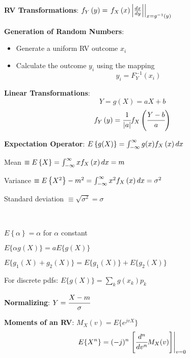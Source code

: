 \documentclass{article}
\newcommand{\sect}[1]{\noindent\textbf{#1}}
\begin{document}
\begin{small}
\begin{multicols*}{2}
	\sect{RV Transformations}: $\pdf[Y][y] = \left.\pdf[X][x] \left|\frac{dx}{dy}\right|\right|_{x=g^{-1}(y)}$
	
	\sect{Generation of Random Numbers}:
	
	\begin{itemize}
		\item Generate a uniform RV outcome $x_i$
		\item Calculate the outcome $y_i$ using the mapping
		\[y_i = F_Y^{-1}(x_i)\]
	\end{itemize}

	\sect{Linear Transformations}:
	\[Y = g(X) = aX+b\]
	\[\pdf[Y][y] = \cfrac{1}{|a|}\pdf[X][\cfrac{Y-b}{a}] \]
	
	\sect{Expectation Operator}: $E\left\{ g(X) \right\} = \int^\infty_{-\infty} g(x)\pdf dx$
	
	Mean $\equiv E\left\{ X \right\} = \int_{-\infty}^{\infty} x\pdf dx = m$
	
	Variance $\equiv E\left\{ X^2 \right\} - m^2 = \int_{-\infty}^{\infty} x^2 \pdf dx = \sigma^2$
	
	Standard deviation $\equiv \sqrt{\sigma^2} = \sigma$
	
	~
	
	$E\left\{ \alpha \right\} = \alpha$ for $\alpha$ constant
	
	$E\{\alpha g(X)\} = aE\{g(X)\}$
	
	$E\{g_1(X)+g_2(X)\} = E\{g_1(X)\} + E\{g_2(X)\}$
	
	For discrete pdfs: $E\{g(X)\} = \sum\limits_k g(x_k)p_k$

	\sect{Normalizing}: $Y = \cfrac{X-m}{\sigma}$
	
	\sect{Moments of an RV}: $M_X(v) = E\{e^{jvX}\}$
	\[E\{X^n\}= (-j)^n\left.\left[ \cfrac{d^n}{dv^n} M_X(v) \right]\right|_{v=0} \]
	

\end{multicols*}
\end{small}
\end{document}
